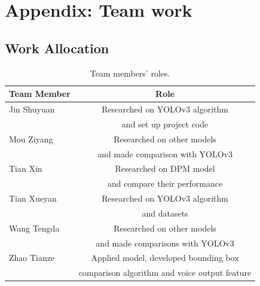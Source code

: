 \documentclass[letterpaper]{article} %
\begin{document}
\newpage

\section{Appendix: Team work}
\subsection{Work Allocation}
\begin{table}[ht!]
\centering
\resizebox{1\linewidth}{!}
{
\begin{tabular}{|l|c|}
\hline
\textbf{Team Member} &  \textbf{Role}  \\ \hline
Jin Shuyuan &  Researched on YOLOv3 algorithm \\ 
    &  and set up project code\\
\hline
Mou Ziyang & Researched on other models \\ 
& and made comparison with YOLOv3\\ \hline
Tian Xin & Researched on DPM model \\
 & and compare their performance \\ \hline
Tian Xueyan & Researched on YOLOv3 algorithm \\ 
 & and datasets \\ \hline
Wang Tengda & Researched on other models \\
 & and made comparisons with YOLOv3 \\ \hline
Zhao Tianze & Applied model, developed bounding box \\
 & comparison algorithm and voice output feature\\ \hline
\end{tabular}
}
\vspace{-2mm}
\caption{\footnotesize{Team members' roles.}}
\label{tab:time}\vspace{-1em}
\end{table}
\end{document}
